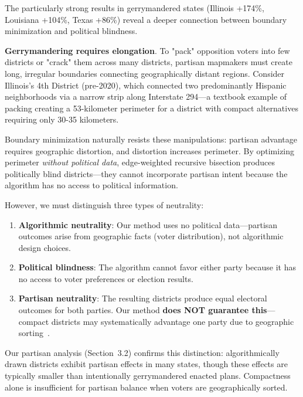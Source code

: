 The particularly strong results in gerrymandered states (Illinois +174\%, Louisiana +104\%, Texas +86\%) reveal a deeper connection between boundary minimization and political blindness.

\textbf{Gerrymandering requires elongation}. To "pack" opposition voters into few districts or "crack" them across many districts, partisan mapmakers must create long, irregular boundaries connecting geographically distant regions. Consider Illinois's 4th District (pre-2020), which connected two predominantly Hispanic neighborhoods via a narrow strip along Interstate 294—a textbook example of packing creating a 53-kilometer perimeter for a district with compact alternatives requiring only 30-35 kilometers.

Boundary minimization naturally resists these manipulations: partisan advantage requires geographic distortion, and distortion increases perimeter. By optimizing perimeter \textit{without political data}, edge-weighted recursive bisection produces politically blind districts—they cannot incorporate partisan intent because the algorithm has no access to political information.

However, we must distinguish three types of neutrality:

\begin{enumerate}
    \item \textbf{Algorithmic neutrality}: Our method uses no political data—partisan outcomes arise from geographic facts (voter distribution), not algorithmic design choices.

    \item \textbf{Political blindness}: The algorithm cannot favor either party because it has no access to voter preferences or election results.

    \item \textbf{Partisan neutrality}: The resulting districts produce equal electoral outcomes for both parties. Our method \textbf{does NOT guarantee this}—compact districts may systematically advantage one party due to geographic sorting~\cite{rodden2019geography}.
\end{enumerate}

Our partisan analysis (Section~3.2) confirms this distinction: algorithmically drawn districts exhibit partisan effects in many states, though these effects are typically smaller than intentionally gerrymandered enacted plans. Compactness alone is insufficient for partisan balance when voters are geographically sorted.

